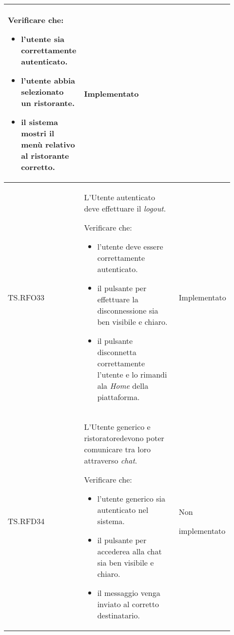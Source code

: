 \begin{longtable}{|p{0.10\linewidth}|p{0.70\linewidth}|p{0.12\linewidth}|}
	Verificare che:
	\begin{itemize}
		\item l'utente sia correttamente autenticato.
		\item l'utente abbia selezionato un ristorante.
		\item il sistema mostri il menù relativo al ristorante corretto.
	\end{itemize}                                                                &
	Implementato                                                                                                                                                            \\
	\hline
	TS.RFO33                                                                                                                        &
	L'Utente autenticato deve effettuare il \textit{logout}. \par
	Verificare che:
	\begin{itemize}
		\item l'utente deve essere correttamente autenticato.
		\item il pulsante per effettuare la disconnessione sia ben visibile e chiaro.
		\item il pulsante disconnetta correttamente l'utente e lo rimandi ala \textit{Home} della piattaforma.
	\end{itemize}                          &
	Implementato                                                                                                                                                            \\
	\hline
	TS.RFD34                                                                                                                        &
	L'Utente generico e ristoratore\g devono poter comunicare tra loro attraverso \textit{chat}. \par
	Verificare che:
	\begin{itemize}
		\item l'utente generico sia autenticato nel sistema.
		\item il pulsante per accederea alla chat sia ben visibile e chiaro.
		\item il messaggio venga inviato al corretto destinatario.
	\end{itemize}                                                            &
	Non \par implementato                                                                                                                                                   \\

\end{longtable}
